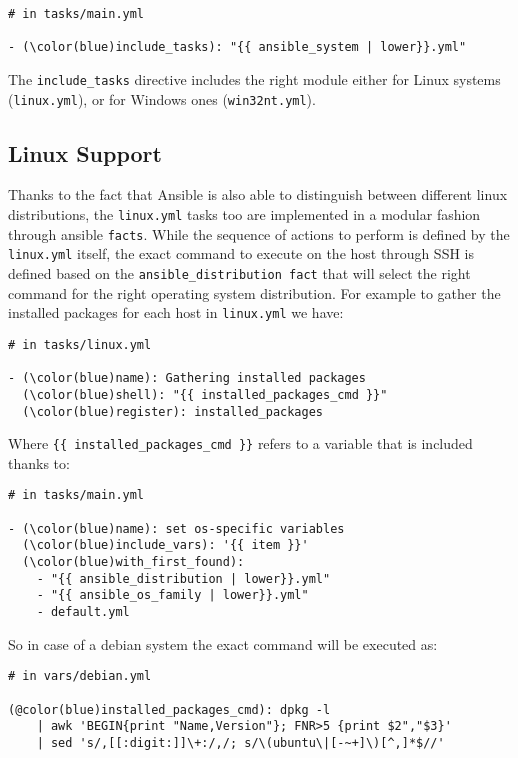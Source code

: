 \documentclass[11pt]{article}
\begin{document}
\begin{Verbatim}[commandchars=\\\(\)]
# in tasks/main.yml

- (\color(blue)include_tasks): "{{ ansible_system | lower}}.yml"
\end{Verbatim}

The {\tt include\_tasks} directive includes the right module either for Linux systems ({\tt linux.yml}), or for Windows ones ({\tt win32nt.yml}). 

\subsection{Linux Support}
Thanks to the fact that Ansible is also able to distinguish between different linux distributions, the {\tt linux.yml} tasks too are implemented in a modular fashion through ansible {\tt facts}. While the sequence of actions to perform is defined by the {\tt linux.yml} itself, the exact command to execute on the host through SSH is defined based on the {\tt ansible\_distribution fact} that will select the right command for the right operating system distribution. For example to gather the installed packages for each host in {\tt linux.yml} we have:

\begin{Verbatim}[commandchars=\\\(\)]
# in tasks/linux.yml

- (\color(blue)name): Gathering installed packages
  (\color(blue)shell): "{{ installed_packages_cmd }}"
  (\color(blue)register): installed_packages
\end{Verbatim}

Where {\tt \{\{ installed\_packages\_cmd \}\}} refers to a variable that is included thanks to:

\begin{Verbatim}[commandchars=\\\(\)]
# in tasks/main.yml

- (\color(blue)name): set os-specific variables
  (\color(blue)include_vars): '{{ item }}'
  (\color(blue)with_first_found):
    - "{{ ansible_distribution | lower}}.yml"
    - "{{ ansible_os_family | lower}}.yml"
    - default.yml
\end{Verbatim}

So in case of a debian system the exact command will be executed as:

\begin{Verbatim}[commandchars=@\(\)]
# in vars/debian.yml

(@color(blue)installed_packages_cmd): dpkg -l 
    | awk 'BEGIN{print "Name,Version"}; FNR>5 {print $2","$3}' 
    | sed 's/,[[:digit:]]\+:/,/; s/\(ubuntu\|[-~+]\)[^,]*$//'
\end{Verbatim}
\end{document}
